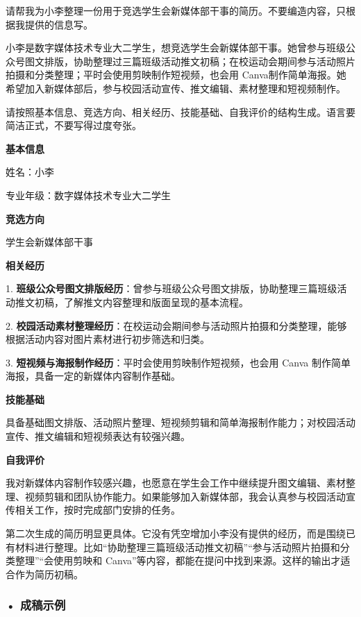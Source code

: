 \begin{userbox}
请帮我为小李整理一份用于竞选学生会新媒体部干事的简历。不要编造内容，只根据我提供的信息写。

小李是数字媒体技术专业大二学生，想竞选学生会新媒体部干事。她曾参与班级公众号图文排版，协助整理过三篇班级活动推文初稿；在校运动会期间参与活动照片拍摄和分类整理；平时会使用剪映制作短视频，也会用 Canva\footnotemark 制作简单海报。她希望加入新媒体部后，参与校园活动宣传、推文编辑、素材整理和短视频制作。

请按照基本信息、竞选方向、相关经历、技能基础、自我评价的结构生成。语言要简洁正式，不要写得过度夸张。
\end{userbox}


\begin{aibox}
\textbf{基本信息}

姓名：小李

专业年级：数字媒体技术专业大二学生

\textbf{竞选方向}

学生会新媒体部干事

\textbf{相关经历}

1. \textbf{班级公众号图文排版经历}：曾参与班级公众号图文排版，协助整理三篇班级活动推文初稿，了解推文内容整理和版面呈现的基本流程。

2. \textbf{校园活动素材整理经历}：在校运动会期间参与活动照片拍摄和分类整理，能够根据活动内容对图片素材进行初步筛选和归类。

3. \textbf{短视频与海报制作经历}：平时会使用剪映制作短视频，也会用 Canva 制作简单海报，具备一定的新媒体内容制作基础。

\textbf{技能基础}

具备基础图文排版、活动照片整理、短视频剪辑和简单海报制作能力；对校园活动宣传、推文编辑和短视频表达有较强兴趣。

\textbf{自我评价}

我对新媒体内容制作较感兴趣，也愿意在学生会工作中继续提升图文编辑、素材整理、视频剪辑和团队协作能力。如果能够加入新媒体部，我会认真参与校园活动宣传相关工作，按时完成部门安排的任务。
\end{aibox}

第二次生成的简历明显更具体。它没有凭空增加小李没有提供的经历，而是围绕已有材料进行整理。比如“协助整理三篇班级活动推文初稿”“参与活动照片拍摄和分类整理”“会使用剪映和 Canva”等内容，都能在提问中找到来源。这样的输出才适合作为简历初稿。

\subsubsection*{\textbf{• 成稿示例}}

